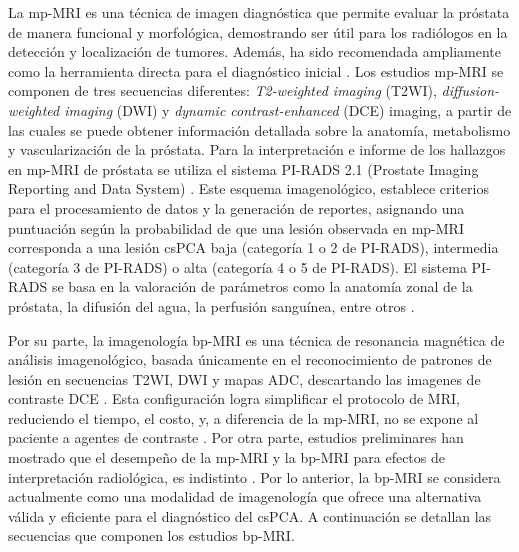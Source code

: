 La mp-MRI es una técnica de imagen diagnóstica que permite evaluar la próstata de manera funcional y morfológica, demostrando ser útil para los radiólogos en la detección y localización de tumores. Además, ha sido recomendada ampliamente como la herramienta directa para el diagnóstico inicial . Los estudios mp-MRI se componen de tres secuencias diferentes: \textit{T2-weighted imaging} (T2WI), \textit{diffusion-weighted imaging} (DWI) y \textit{dynamic contrast-enhanced} (DCE) imaging, a partir de las cuales se puede obtener información detallada sobre la anatomía, metabolismo y vascularización de la próstata. Para la interpretación e informe de los hallazgos en mp-MRI de próstata se utiliza el sistema PI-RADS 2.1 (Prostate Imaging Reporting and Data System) . Este esquema imagenológico, establece criterios para el procesamiento de datos y la generación de reportes, asignando una puntuación según la probabilidad de que una lesión observada en mp-MRI corresponda a una lesión csPCA baja (categoría 1 o 2 de PI-RADS), intermedia (categoría 3 de PI-RADS) o alta (categoría 4 o 5 de PI-RADS). El sistema PI-RADS se basa en la valoración de parámetros como la anatomía zonal de la próstata, la difusión del agua, la perfusión sanguínea, entre otros .\par

Por su parte, la imagenología bp-MRI es una técnica de resonancia magnética de análisis imagenológico, basada únicamente en el reconocimiento de patrones de lesión en secuencias T2WI, DWI y mapas ADC, descartando las imagenes de contraste DCE . Esta configuración logra simplificar el protocolo de MRI, reduciendo el tiempo, el costo, y, a diferencia de la mp-MRI, no se expone al paciente a agentes de contraste . Por otra parte, estudios preliminares han mostrado que el desempeño de la mp-MRI y la bp-MRI para efectos de interpretación radiológica, es indistinto . Por lo anterior, la bp-MRI se considera actualmente como una modalidad de imagenología que ofrece una alternativa válida y eficiente para el diagnóstico del csPCA. A continuación se detallan las secuencias que componen los estudios bp-MRI.

